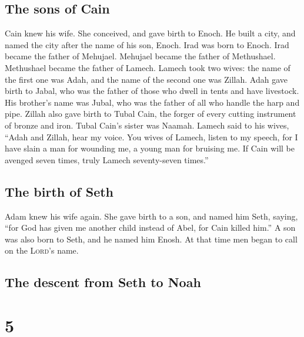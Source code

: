 \hypertarget{the-sons-of-cain}{%
\subsection{The sons of Cain}\label{the-sons-of-cain}}

 Cain knew his wife. She conceived, and gave birth to
Enoch. He built a city, and named the city after the name of his son,
Enoch.  Irad was born to Enoch. Irad became the father of
Mehujael. Mehujael became the father of Methushael. Methushael became
the father of Lamech.  Lamech took two wives: the name of
the first one was Adah, and the name of the second one was Zillah.
 Adah gave birth to Jabal, who was the father of those
who dwell in tents and have livestock.  His brother's
name was Jubal, who was the father of all who handle the harp and pipe.
 Zillah also gave birth to Tubal Cain, the forger of
every cutting instrument of bronze and iron. Tubal Cain's sister was
Naamah.  Lamech said to his wives, ``Adah and Zillah,
hear my voice. You wives of Lamech, listen to my speech, for I have
slain a man for wounding me, a young man for bruising me.
 If Cain will be avenged seven times, truly Lamech
seventy-seven times.''

\hypertarget{the-birth-of-seth}{%
\subsection{The birth of Seth}\label{the-birth-of-seth}}

 Adam knew his wife again. She gave birth to a son, and
named him Seth, saying, ``for God has given me another child instead of
Abel, for Cain killed him.''  A son was also born to
Seth, and he named him Enosh. At that time men began to call on the
\textsc{Lord}'s name.

\hypertarget{the-descent-from-seth-to-noah}{%
\subsection{The descent from Seth to
Noah}\label{the-descent-from-seth-to-noah}}

\hypertarget{section-4}{%
\section{5}\label{section-4}}

